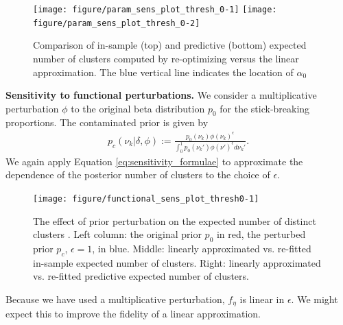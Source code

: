 \documentclass[a0,plainsections]{sciposter}\usepackage[]{graphicx}\usepackage[]{color}
\newenvironment{knitrout}{}{} %
\begin{document}
\begin{minipage}[t]{0.45\textwidth}
\begin{figure}
\centering
\begin{knitrout}
\color{fgcolor}

{\centering \texttt{[image: figure/param\_sens\_plot\_thresh\_0-1]} 
\texttt{[image: figure/param\_sens\_plot\_thresh\_0-2]} 

}



\end{knitrout}
\caption{Comparison of in-sample (top) and predictive (bottom) expected number of clusters computed by re-optimizing versus the linear approximation. 
The blue vertical line indicates the location of $\alpha_0$}
\end{figure}

{\bf \large Sensitivity to functional perturbations. }
We consider a multiplicative perturbation $\phi$ to
the original beta distribution $p_0$ for the stick-breaking proportions. The contaminated prior is given by 
\begin{align}
\label{eq:expon_perturb}
	p_c(\nu_k \vert \delta, \phi) :=
  \frac{p_{0}(\nu_k)\phi(\nu_k)^\epsilon}
       {\int_0^1 p_0(\nu_k')\phi(\nu')^\epsilon d\nu_k'}.
\end{align}
We again apply Equation \ref{eq:sensitivity_formulae} to approximate the dependence of the posterior number of clusters to the choice of $\epsilon$. 
\begin{figure}
\centering

\begin{knitrout}
\color{fgcolor}

{\centering \texttt{[image: figure/functional\_sens\_plot\_thresh0-1]} 

}



\end{knitrout}
\caption{The effect of prior perturbation on the expected number of distinct clusters . Left column: the original prior $p_0$ in red, the perturbed prior $p_c$, $\epsilon = 1$, in blue. Middle: linearly approximated vs.
re-fitted in-sample expected number of clusters. Right: linearly approximated vs. re-fitted predictive expected number of clusters.}
\end{figure}

Because we have used a multiplicative perturbation, $f_\eta$
is linear in $\epsilon$. We might expect this to improve the fidelity of a
linear approximation. 


\end{minipage}
\end{document}
